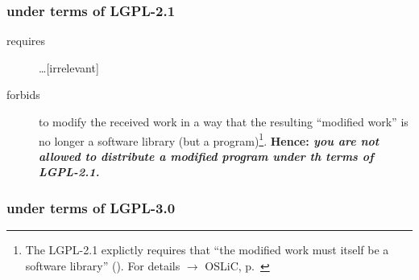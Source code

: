 \subsubsection{under terms of LGPL-2.1}

\begin{description}
  \item[requires] \ldots [irrelevant] 
  \item[forbids] to modify the received work in a way that the resulting
  \enquote{modified work} is no longer a software library (but a
  program)\footnote{The LGPL-2.1 explictly requires that \enquote{the modified
  work must itself be a software library} (\cite[cf.][\nopage wp.\
  §2a]{Lgpl21OsiLicense1999a}). For details $\rightarrow$ OSLiC, p.\
  \pageref{para:libislib}}. \textbf{Hence: \emph{you are not allowed to
  distribute a modified program under th terms of LGPL-2.1.}}
\end{description}

\subsubsection{under terms of LGPL-3.0}

